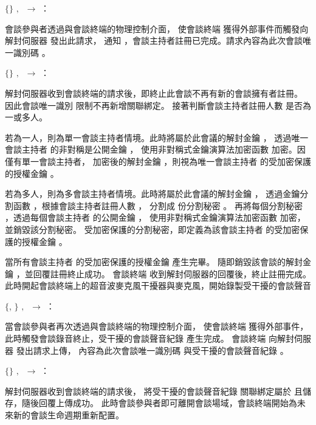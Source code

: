 \begin{pmsgs}
    \item $\{$\DEFsessionID$\}$ $,~$ \DEFmeetingbox $\rightarrow$ \DEFserver：

        會談參與者透過與會談終端的物理控制介面，
    使會談終端 \DEFmeetingbox 獲得外部事件而觸發向解封伺服器 \DEFserver 發出此請求，
    通知 \DEFserver，會談主持者註冊已完成。請求內容為此次會談唯一識別碼 \DEFsessionID。

    \item $\{\}$ $,~$ \DEFserver $\rightarrow$ \DEFmeetingbox：

        解封伺服器收到會談終端的請求後，即終止此會談不再有新的會談擁有者註冊。
    因此會談唯一識別 \DEFsessionID 限制不再新增關聯綁定。
    接著判斷會談主持者註冊人數 \DEFowner 是否為一或多人。

        若為一人，則為單一會談主持者情境。此時將屬於此會議的解封金鑰 \DEFunsealKey，
    透過唯一會談主持者 \DEFowner 的非對稱是公開金鑰 \DEFpublicKey，
    使用非對稱式金鑰演算法加密函數 \DEFfuncEncPK{} 加密。因僅有單一會談主持者，
    加密後的解封金鑰 \DEFunsealKey，則視為唯一會談主持者 \DEFowner 的受加密保護的授權金鑰 \DEFakEnc。

        若為多人，則為多會談主持者情境。此時將屬於此會議的解封金鑰 \DEFunsealKey，
    透過金鑰分割函數 \DEFfuncSSS{}，根據會談主持者註冊人數 \DEFowreg，
    分割成 \DEFowreg 份分割秘密 \DEFsharesAll。
    再將每個分割秘密 \DEFshares，透過每個會談主持者 \DEFowner 的公開金鑰 \DEFpublicKey，
    使用非對稱式金鑰演算法加密函數 \DEFfuncEncPK{} 加密，並銷毀該分割秘密。
    受加密保護的分割秘密，即定義為該會談主持者 \DEFowner 的受加密保護的授權金鑰 \DEFakEnc。

        當所有會談主持者 \DEFowner 的受加密保護的授權金鑰 \DEFakEnc 產生完畢。
    隨即銷毀該會談的解封金鑰 \DEFunsealKey，並回覆註冊終止成功。
    會談終端 \DEFmeetingbox 收到解封伺服器的回覆後，終止註冊完成。
    此時開起會談終端上的超音波麥克風干擾器與麥克風，開始錄製受干擾的會談聲音 \DEFrecJ

    \item $\{$\DEFsessionID, \DEFrecJ$\}$ $,~$ \DEFmeetingbox $\rightarrow$ \DEFserver：

        當會談參與者再次透過與會談終端的物理控制介面，
    使會談終端 \DEFmeetingbox 獲得外部事件，此時觸發會談錄音終止，受干擾的會談聲音紀錄 \DEFrecJ 產生完成。
    會談終端 \DEFmeetingbox 向解封伺服器 \DEFserver 發出請求上傳，
    內容為此次會談唯一識別碼 \DEFsessionID 與受干擾的會談聲音紀錄 \DEFrecJ。

    \item $\{\}$ $,~$ \DEFserver $\rightarrow$ \DEFmeetingbox：

        解封伺服器收到會談終端的請求後，
    將受干擾的會談聲音紀錄 \DEFrecJ 關聯綁定屬於 \DEFsessionID 且儲存，隨後回覆上傳成功。
    此時會談參與者即可離開會談場域，會談終端開始為未來新的會談生命週期重新配置。
\end{pmsgs}


